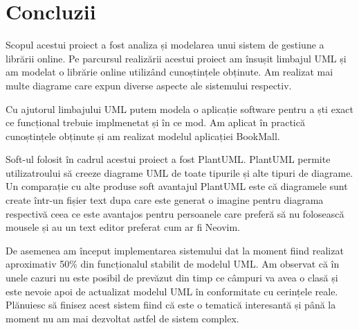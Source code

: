 \clearpage
\section*{Concluzii}

Scopul acestui proiect a fost analiza și modelarea unui sistem de gestiune a
librării online. Pe parcursul realizării acestui proiect am însușit limbajul
UML și am modelat o librărie online utilizând cunoștințele obținute. Am
realizat mai multe diagrame care expun diverse aspecte ale sistemului
respectiv.

Cu ajutorul limbajului UML putem modela o aplicație software pentru a ști exact
ce funcțional trebuie implmenetat și în ce mod. Am aplicat în practică
cunoștințele obținute și am realizat modelul aplicației BookMall.

Soft-ul folosit în cadrul acestui proiect a fost PlantUML. PlantUML permite
utilizatroului să creeze diagrame UML de toate tipurile și alte tipuri de
diagrame. Un comparație cu alte produse soft avantajul PlantUML este că
diagramele sunt create într-un fișier text dupa care este generat o imagine
pentru diagrama respectivă ceea ce este avantajos pentru persoanele care
preferă să nu folosească mousele și au un text editor preferat cum ar fi
Neovim.

De asemenea am început implementarea sistemului dat la moment fiind realizat
aproximativ 50\% din funcționalul stabilit de modelul UML. Am observat că în
unele cazuri nu este posibil de prevăzut din timp ce câmpuri va avea o clasă și
este nevoie apoi de actualizat modelul UML în conformitate cu cerințele reale.
Plănuiesc să finisez acest sistem fiind că este o tematică interesantă și până
la moment nu am mai dezvoltat astfel de sistem complex.

